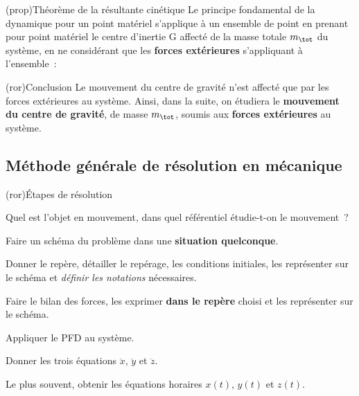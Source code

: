 \documentclass[../../main/main.tex]{subfiles}
\begin{document}
\begin{tcb*}(prop){Théorème de la résultante cinétique}
	Le principe fondamental de la dynamique pour un point matériel s'applique à un
	ensemble de point en prenant pour point matériel le centre d'inertie G affecté
	de la masse totale $m_{\tot}$ du système, en ne considérant que les
	\textbf{forces extérieures} s'appliquant à l'ensemble~: \psw{
		\[\boxed{m_{\tot}\dv{\vf(\Gr)}{t} = \sum \Ff_{\ext}}\]
	}
\end{tcb*}

\begin{tcb*}(ror){Conclusion}
	Le mouvement du centre de gravité n’est affecté que par les forces extérieures
	au système. Ainsi, dans la suite, on étudiera le \textbf{mouvement du centre
		de gravité}, de masse $m_{\tot}$, soumis aux \textbf{forces extérieures} au
	système.
\end{tcb*}

\subsection{Méthode générale de résolution en mécanique}
\begin{tcb*}(ror){Étapes de résolution}
	\begin{enumerate}[label=\sqenumi]
		 Quel est l'objet en mouvement, dans quel
		référentiel étudie-t-on le mouvement~?

		 Faire un schéma du problème dans une \textbf{situation
			quelconque}.

		 Donner le repère, détailler le repérage, les conditions
		initiales, les représenter sur le schéma et \textit{définir les notations}
		nécessaires.

		 Faire le bilan des forces, les exprimer \textbf{dans
			le repère} choisi et les représenter sur le schéma.

		 Appliquer le PFD au système.

		 Donner les trois équations $\ddot{x}$,
		$\ddot{y}$ et $\ddot{z}$.

		 Le plus souvent, obtenir les équations
		horaires $x(t)$, $y(t)$ et $z(t)$.
	\end{enumerate}
\end{tcb*}
\end{document}
